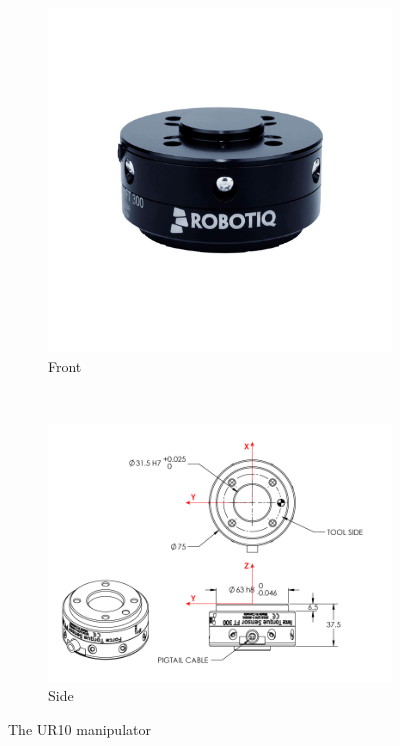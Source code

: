 \documentclass[times, utf8, diplomski, english]{fer}
\begin{document}
\begin{figure}[h,t!]
    \centering
        \begin{subfigure}[t]{0.34\textwidth}
        \includegraphics[clip, trim=0cm 5cm 0cm 5cm, width=\textwidth]{FT300_pic}
        \caption{Front}
    \end{subfigure}
    ~
    \begin{subfigure}[t]{0.34\textwidth}
        \includegraphics[width=\textwidth]{FT300}
        \caption{Side}
    \end{subfigure}
    \caption{The UR10 manipulator}\label{fig:ur10}
\end{figure}
\end{document}
